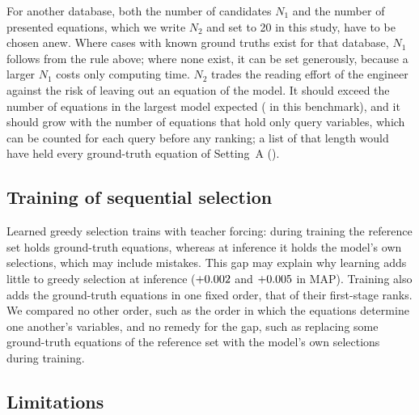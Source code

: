 For another database, both the number of candidates $N_1$ and the number of presented equations,
which we write $N_2$ and set to 20 in this study, have to be chosen anew. Where cases with known
ground truths exist for that database, $N_1$ follows from the rule above; where none exist, it can
be set generously, because a larger $N_1$ costs only computing time. $N_2$ trades the reading
effort of the engineer against the risk of leaving out an equation of the model. It should exceed
the number of equations in the largest model expected (\MaxKSynth{} in this benchmark), and it
should grow with the number of equations that hold only query variables, which can be counted for
each query before any ranking; a list of that length would have held every ground-truth equation
of Setting~A ().

\ifthesis{}\fi

\subsection{Training of sequential selection}\label{sec:tfdiscussion}

Learned greedy selection trains with teacher forcing: during training the reference set holds
ground-truth equations, whereas at inference it holds the model's own selections, which may include
mistakes. This gap may explain why learning adds little to greedy selection at inference
($+0.002$ and $+0.005$ in MAP). Training also adds the ground-truth
equations in one fixed order, that of their first-stage ranks. We compared no other order, such as
the order in which the equations determine one another's variables, and no remedy for the gap, such
as replacing some ground-truth equations of the reference set with the model's own selections
during training.

\subsection{Limitations}\label{sec:limitations}

